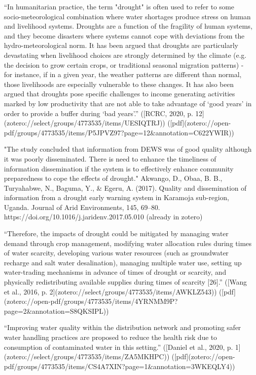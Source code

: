 {{%
“In humanitarian practice, the term "drought" is often used to refer to some socio-meteorological combination where water shortages produce stress on human and livelihood systems. Droughts are a function of the fragility of human systems, and they become disasters where systems cannot cope with deviations from the hydro-meteorological norm. It has been argued that droughts are particularly devastating when livelihood choices are strongly determined by the climate (e.g. the decision to grow certain crops, or traditional seasonal migration patterns) - for instance, if in a given year, the weather patterns are different than normal, those livelihoods are especially vulnerable to these changes. It has also been argued that droughts pose specific challenges to income generating activities marked by low productivity that are not able to take advantage of ‘good years’ in order to provide a buffer during ‘bad years’.” ([RCRC, 2020, p. 12](zotero://select/groups/4773535/items/UESIQTRJ)) ([pdf](zotero://open-pdf/groups/4773535/items/P5JPVZ97?page=12&annotation=C622YWIR))

"The study concluded that information from DEWS was of good quality although it was poorly disseminated. There is need to enhance the timeliness of information dissemination if the system is to effectively enhance community preparedness to cope the effects of drought." Akwango, D., Obaa, B. B., Turyahabwe, N., Baguma, Y., & Egeru, A. (2017). Quality and dissemination of information from a drought early warning system in Karamoja sub-region, Uganda. Journal of Arid Environments, 145, 69–80. https://doi.org/10.1016/j.jaridenv.2017.05.010 (already in zotero)


“Therefore, the impacts of drought could be mitigated by managing water demand through crop management, modifying water allocation rules during times of water scarcity, developing various water resources (such as groundwater recharge and salt water desalination), managing multiple water use, setting up water-trading mechanisms in advance of times of drought or scarcity, and physically redistributing available supplies during times of scarcity [26].” ([Wang et al., 2016, p. 2](zotero://select/groups/4773535/items/AWKLZ543)) ([pdf](zotero://open-pdf/groups/4773535/items/4YRNMM9P?page=2&annotation=S8QKSIPL))

“Improving water quality within the distribution network and promoting safer water handling practices are proposed to reduce the health risk due to consumption of contaminated water in this setting.” ([Daniel et al., 2020, p. 1](zotero://select/groups/4773535/items/ZA5MKHPC)) ([pdf](zotero://open-pdf/groups/4773535/items/CS4A7XIN?page=1&annotation=3WKEQLY4))


}}
